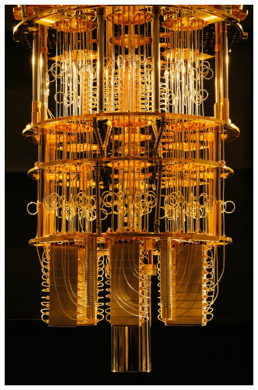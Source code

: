 \documentclass{article}
\begin{document}
\begin{figure}[h!]
	\centering
	\includegraphics[width=\linewidth]{darktheme_fridge_nothuge.jpg}
\end{figure}
\end{document}
